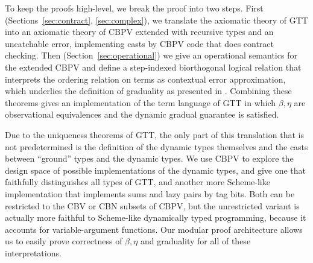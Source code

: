 \documentclass[acmsmall,nonacm]{acmart}
\begin{document}
To keep the proofs high-level, we break the proof into two steps.
%
First (Sections~\ref{sec:contract}, \ref{sec:complex}), we translate the
axiomatic theory of GTT into an axiomatic theory of CBPV extended with
recursive types and an uncatchable error, implementing casts by CBPV
code that does contract checking.
%
Then
(Section~\ref{sec:operational}) we give an operational semantics
for the extended CBPV and define a step-indexed biorthogonal logical
relation that interprets the ordering relation on terms as contextual
error approximation, which underlies the definition of graduality as
presented in \citep{newahmed18}.
%
Combining these theorems gives an implementation of the term
language of GTT in which $\beta, \eta$ are observational equivalences
and the dynamic gradual guarantee is satisfied.

Due to the uniqueness theorems of GTT, the only part of this translation that is not
predetermined is the definition of the dynamic types themselves and the
casts between ``ground'' types and the dynamic types.
%
We use CBPV to explore the design space of possible implementations of
the dynamic types, and give one that faithfully distinguishes all types
of GTT, and another more Scheme-like implementation that implements sums
and lazy pairs by tag bits.
%
Both can be restricted to the CBV or CBN subsets of CBPV, but the
unrestricted variant is actually more faithful to Scheme-like
dynamically typed programming, because it accounts for variable-argument
functions.
%
Our modular proof architecture allows us to easily prove correctness
of $\beta, \eta$ and graduality for all of these interpretations.
\end{document}
